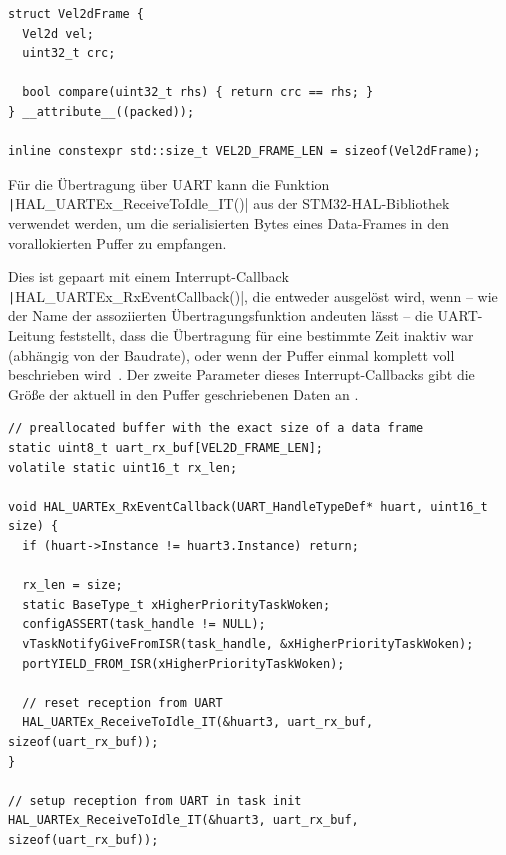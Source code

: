 \begin{code}
\begin{verbatim}
struct Vel2dFrame {
  Vel2d vel;
  uint32_t crc;

  bool compare(uint32_t rhs) { return crc == rhs; }
} __attribute__((packed));

inline constexpr std::size_t VEL2D_FRAME_LEN = sizeof(Vel2dFrame);
\end{verbatim}
\end{code}

Für die Übertragung über UART kann die Funktion
\texttt|HAL_UARTEx_ReceiveToIdle_IT()| aus der STM32-HAL-Bibliothek
verwendet werden, um die serialisierten Bytes eines Data-Frames in den
vorallokierten Puffer zu empfangen.

Dies ist gepaart mit einem Interrupt-Callback
\texttt|HAL_UARTEx_RxEventCallback()|, die entweder ausgelöst wird,
wenn -- wie der Name der assoziierten Übertragungsfunktion andeuten lässt -- die
UART-Leitung feststellt, dass die Übertragung für eine bestimmte Zeit inaktiv
war (abhängig von der Baudrate), oder wenn der Puffer einmal komplett voll
beschrieben wird~\cite{HAL_UARTEx_ReceiveToIdle_IT}. Der zweite Parameter dieses
Interrupt-Callbacks gibt die Größe der aktuell in den Puffer geschriebenen Daten
an \cite{HAL_UARTEx_RxEventCallback}.

\begin{code}
\begin{verbatim}
// preallocated buffer with the exact size of a data frame
static uint8_t uart_rx_buf[VEL2D_FRAME_LEN];
volatile static uint16_t rx_len;

void HAL_UARTEx_RxEventCallback(UART_HandleTypeDef* huart, uint16_t size) {
  if (huart->Instance != huart3.Instance) return;

  rx_len = size;
  static BaseType_t xHigherPriorityTaskWoken;
  configASSERT(task_handle != NULL);
  vTaskNotifyGiveFromISR(task_handle, &xHigherPriorityTaskWoken);
  portYIELD_FROM_ISR(xHigherPriorityTaskWoken);

  // reset reception from UART
  HAL_UARTEx_ReceiveToIdle_IT(&huart3, uart_rx_buf, sizeof(uart_rx_buf));
}

// setup reception from UART in task init
HAL_UARTEx_ReceiveToIdle_IT(&huart3, uart_rx_buf, sizeof(uart_rx_buf));
\end{verbatim}
\end{code}

